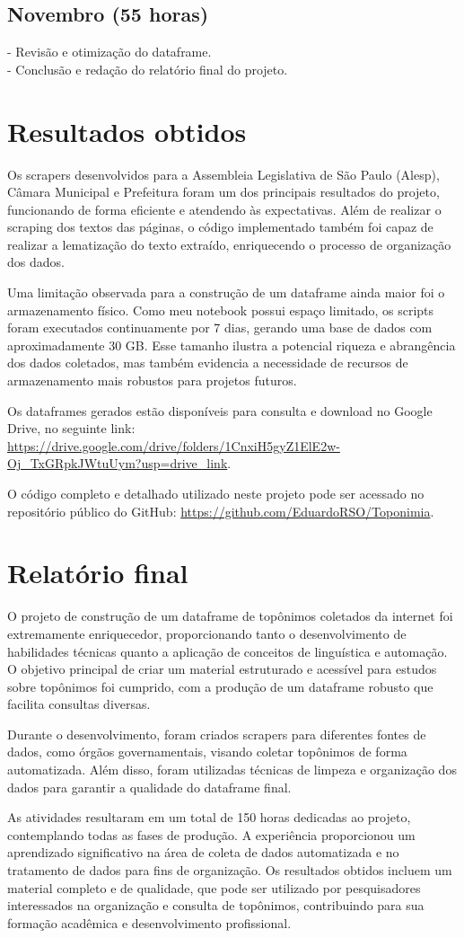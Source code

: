 \documentclass{article}
\begin{document}
\subsection*{Novembro (55 horas)}
- Revisão e otimização do dataframe.\\
- Conclusão e redação do relatório final do projeto.\\

\section*{Resultados obtidos}
Os scrapers desenvolvidos para a Assembleia Legislativa de São Paulo (Alesp), Câmara Municipal e Prefeitura foram um dos principais resultados do projeto, funcionando de forma eficiente e atendendo às expectativas. Além de realizar o scraping dos textos das páginas, o código implementado também foi capaz de realizar a lematização do texto extraído, enriquecendo o processo de organização dos dados.

Uma limitação observada para a construção de um dataframe ainda maior foi o armazenamento físico. Como meu notebook possui espaço limitado, os scripts foram executados continuamente por 7 dias, gerando uma base de dados com aproximadamente 30 GB. Esse tamanho ilustra a potencial riqueza e abrangência dos dados coletados, mas também evidencia a necessidade de recursos de armazenamento mais robustos para projetos futuros.

Os dataframes gerados estão disponíveis para consulta e download no Google Drive, no seguinte link: \url{https://drive.google.com/drive/folders/1CnxiH5gyZ1ElE2w-Oj_TxGRpkJWtuUym?usp=drive_link}.

O código completo e detalhado utilizado neste projeto pode ser acessado no repositório público do GitHub: \url{https://github.com/EduardoRSO/Toponimia}.

\section*{Relatório final}
O projeto de construção de um dataframe de topônimos coletados da internet foi extremamente enriquecedor, proporcionando tanto o desenvolvimento de habilidades técnicas quanto a aplicação de conceitos de linguística e automação. O objetivo principal de criar um material estruturado e acessível para estudos sobre topônimos foi cumprido, com a produção de um dataframe robusto que facilita consultas diversas.

Durante o desenvolvimento, foram criados scrapers para diferentes fontes de dados, como órgãos governamentais, visando coletar topônimos de forma automatizada. Além disso, foram utilizadas técnicas de limpeza e organização dos dados para garantir a qualidade do dataframe final.

As atividades resultaram em um total de 150 horas dedicadas ao projeto, contemplando todas as fases de produção. A experiência proporcionou um aprendizado significativo na área de coleta de dados automatizada e no tratamento de dados para fins de organização. Os resultados obtidos incluem um material completo e de qualidade, que pode ser utilizado por pesquisadores interessados na organização e consulta de topônimos, contribuindo para sua formação acadêmica e desenvolvimento profissional.
\end{document}
